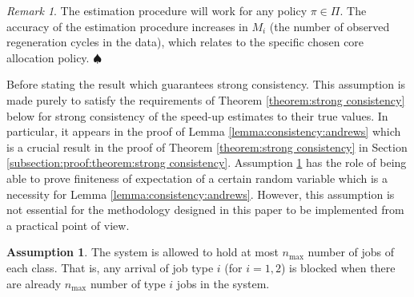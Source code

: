 \documentclass[11pt]{article}
\newcommand{\jp}[1]{\footnote{J-P: #1}}
\theoremstyle{remark}
\newtheorem{remark}[thm]{Remark}
\theoremstyle{definition}
\newtheorem{ass}[thm]{Assumption}
\numberwithin{equation}{section}
\begin{document}
\begin{remark}
    The estimation procedure will work for any policy $\pi \in \Pi$.  
    The accuracy of the estimation procedure increases in $M_i$ (the number of observed regeneration cycles in the data), which relates to the specific chosen core allocation policy. \hfill $\spadesuit$
\end{remark}


Before stating the result which guarantees strong consistency.
This assumption is made purely to satisfy the requirements of Theorem \ref{theorem:strong consistency} below for strong consistency of the speed-up estimates to their true values.
In particular, it appears in the proof of Lemma \ref{lemma:consistency:andrews} which is a crucial result in the proof of Theorem \ref{theorem:strong consistency} in Section \ref{subsection:proof:theorem:strong consistency}.
Assumption \ref{ass: max jobs} has the role of being able to prove finiteness of expectation of a certain random variable which is a necessity for Lemma \ref{lemma:consistency:andrews}.
However, this assumption is not essential for the methodology designed in this paper to be implemented from a practical point of view.
\begin{ass} \label{ass: max jobs}
    The system is allowed to hold at most $n_{\max}$ number of jobs of each class. That is, any arrival of job type $i$ (for $i = 1,2$) is blocked when there are already $n_{\max}$ number of type $i$ jobs in the system.
\end{ass}
\end{document}
